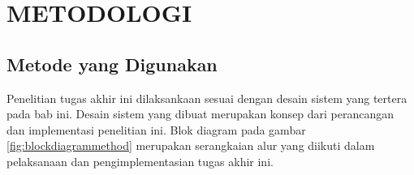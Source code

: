 \chapter{METODOLOGI}
\label{chap:metodologi}






\section{Metode yang Digunakan}

Penelitian tugas akhir ini dilaksankaan sesuai dengan desain sistem yang tertera pada bab ini. Desain sistem yang dibuat merupakan konsep dari perancangan dan implementasi penelitian ini. Blok diagram pada gambar \ref{fig:blockdiagrammethod} merupakan serangkaian alur yang diikuti dalam pelaksanaan dan pengimplementasian tugas akhir ini.

